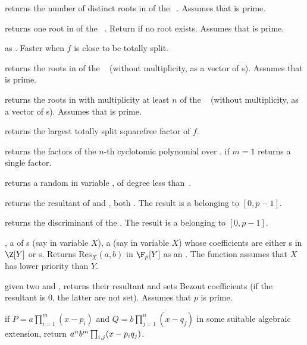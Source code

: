  returns the number of distinct
roots in  of the ~. Assumes that  is prime.

 returns one root in  of
the ~. Return  if no root exists.
Assumes that  is prime.

 as .
Faster when $f$ is close to be totally split.

 returns the roots in  of
the ~ (without multiplicity, as a vector of s).
Assumes that  is prime.

returns the roots in  with multiplicity at least $n$ of
the ~ (without multiplicity, as a vector of s).
Assumes that  is prime.

 returns the largest totally split
squarefree factor of $f$.

 returns the factors
of the $n$-th cyclotomic polynomial over . if $m=1$ returns
a single factor.

 returns a random 
in variable , of degree less than~.

 returns the resultant
of  and , both . The result is a 
belonging to $[0,p-1]$.

 returns the discriminant
of the  . The result is a  belonging to $[0,p-1]$.

,  a  of
s (say in variable $X$),  a  (say in variable $X$)
whose coefficients are either s in $\Z[Y]$ or s.
Returns $\text{Res}_X(a, b)$ in $\F_p[Y]$ as an . The function
assumes that $X$ has lower priority than $Y$.

given two   and ,
returns their resultant and sets Bezout coefficients (if the resultant is $0$,
the latter are not set). Assumes that $p$ is prime.

 if
$P=a\prod_{i=1}^m(x-p_i)$ and $Q=b\prod_{j=1}^n(x-q_j)$ in some suitable
algebraic extension, return $a^n\*b^m\prod_{i,j}(x-p_i\*q_j)$.

